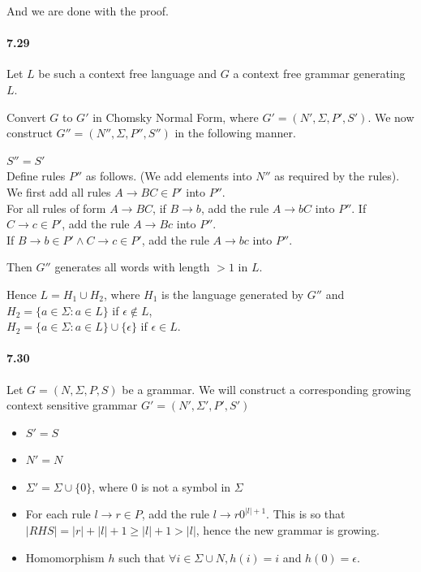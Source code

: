 \documentclass{article}
\begin{document}
And we are done with the proof.

\paragraph{7.29} Let $L$ be such a context free language and $G$ a context free grammar generating $L$.

Convert $G$ to $G'$ in Chomsky Normal Form, where $G'=(N', \Sigma, P', S')$. We now construct $G''=(N'', \Sigma, P'', S'')$ in the following manner.

$S'' = S'$\\
Define rules $P''$ as follows. (We add elements into $N''$ as required by the rules).\\
We first add all rules $A\rightarrow BC\in P'$ into $P''$.\\
For all rules of form $A\rightarrow BC$, if $B\rightarrow b$, add the rule $A\rightarrow bC$ into $P''$.
If $C\rightarrow c \in P'$, add the rule $A\rightarrow Bc$ into $P''$.\\
If $B\rightarrow b\in P'\land C\rightarrow c \in P'$, add the rule $A\rightarrow bc$ into $P''$.

Then $G''$ generates all words with length $>1$ in $L$.

Hence $L = H_1\cup H_2$, where $H_1$ is the language generated by $G''$ and \\
$H_2=\{a\in \Sigma : a\in L\}$ if $\epsilon \notin L$,\\
$H_2=\{a\in \Sigma : a\in L\}\cup \{\epsilon \}$ if $\epsilon \in L$.

\paragraph{7.30} Let $G = (N, \Sigma, P, S)$ be a grammar. We will construct a corresponding growing context sensitive grammar $G' = (N', \Sigma', P', S')$

\begin{itemize}
	\item $S' = S$
	\item $N' = N$
	\item $\Sigma' = \Sigma \cup \{0\}$, where $0$ is not a symbol in $\Sigma$
	\item For each rule $l\rightarrow r \in P$, add the rule $l\rightarrow r0^{|l| + 1}$. This is so that $|RHS| = |r| + |l| + 1\geq |l|+1 > |l|$, hence the new grammar is growing.
	\item Homomorphism $h$ such that $\forall i\in \Sigma \cup N, h(i) = i$ and $h(0) = \epsilon$.
\end{itemize}
\end{document}
